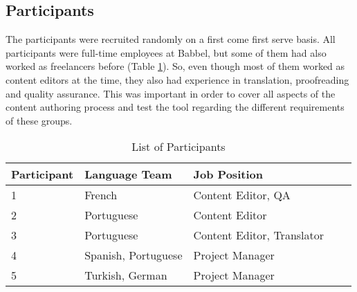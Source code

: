 \subsection{Participants}
The participants were recruited randomly on a first come first serve basis. All participants were full-time employees at Babbel, but some of them had also worked as freelancers before (Table \ref{table:user-test-participants}). So, even though most of them worked as content editors at the time, they also had experience in translation, proofreading and quality assurance. This was important in order to cover all aspects of the content authoring process and test the tool regarding the different requirements of these groups.

\begin{table}[h!]
\begin{tabular}{|l|l|l|p{2cm}|p{4cm}|}
\hline
\rowcolor[HTML]{EFEFEF}
{\bf Participant} & {\bf Language Team} & {\bf Job Position} \\ \hline
1 & French & Content Editor, QA \\ \hline
2 & Portuguese & Content Editor \\ \hline
3 & Portuguese & Content Editor, Translator \\ \hline
4 & Spanish, Portuguese & Project Manager \\ \hline
5 & Turkish, German & Project Manager \\ \hline
\end{tabular}
\centering
\caption{List of Participants}
\label{table:user-test-participants}
\end{table}




